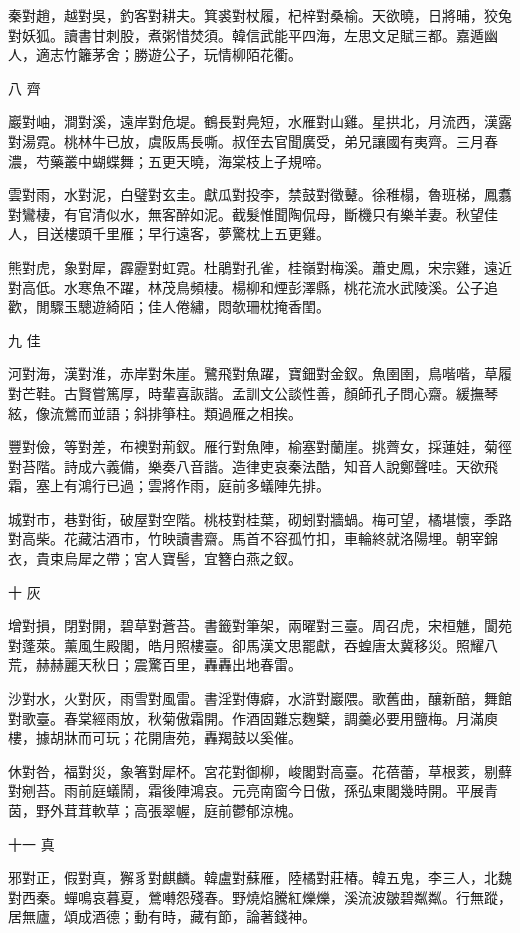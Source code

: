 \documentclass[12pt,a4paper]{ctexbook}
\begin{document}
秦對趙，越對吳，釣客對耕夫。箕裘對杖履，杞梓對桑榆。天欲曉，日將晡，狡兔對妖狐。讀書甘刺股，煮粥惜焚須。韓信武能平四海，左思文足賦三都。嘉遁幽人，適志竹籬茅舍；勝遊公子，玩情柳陌花衢。\par
八 齊\par
巖對岫，澗對溪，遠岸對危堤。鶴長對鳧短，水雁對山雞。星拱北，月流西，漢露對湯霓。桃林牛已放，虞阪馬長嘶。叔侄去官聞廣受，弟兄讓國有夷齊。三月春濃，芍藥叢中蝴蝶舞；五更天曉，海棠枝上子規啼。\par
雲對雨，水對泥，白璧對玄圭。獻瓜對投李，禁鼓對徵鼙。徐稚榻，魯班梯，鳳翥對鸞棲，有官清似水，無客醉如泥。截髮惟聞陶侃母，斷機只有樂羊妻。秋望佳人，目送樓頭千里雁；早行遠客，夢驚枕上五更雞。\par
熊對虎，象對犀，霹靂對虹霓。杜鵑對孔雀，桂嶺對梅溪。蕭史鳳，宋宗雞，遠近對高低。水寒魚不躍，林茂鳥頻棲。楊柳和煙彭澤縣，桃花流水武陵溪。公子追歡，閒驟玉驄遊綺陌；佳人倦繡，悶欹珊枕掩香閨。\par
九 佳\par
河對海，漢對淮，赤岸對朱崖。鷺飛對魚躍，寶鈿對金釵。魚圉圉，鳥喈喈，草履對芒鞋。古賢嘗篤厚，時輩喜詼諧。孟訓文公談性善，顏師孔子問心齋。緩撫琴絃，像流鶯而並語；斜排箏柱。類過雁之相挨。\par
豐對儉，等對差，布襖對荊釵。雁行對魚陣，榆塞對蘭崖。挑薺女，採蓮娃，菊徑對苔階。詩成六義備，樂奏八音諧。造律吏哀秦法酷，知音人說鄭聲哇。天欲飛霜，塞上有鴻行已過；雲將作雨，庭前多蟻陣先排。\par
城對市，巷對街，破屋對空階。桃枝對桂葉，砌蚓對牆蝸。梅可望，橘堪懷，季路對高柴。花藏沽酒市，竹映讀書齋。馬首不容孤竹扣，車輪終就洛陽埋。朝宰錦衣，貴束烏犀之帶；宮人寶髻，宜簪白燕之釵。\par
十 灰\par
增對損，閉對開，碧草對蒼苔。書籤對筆架，兩曜對三臺。周召虎，宋桓魋，閬苑對蓬萊。薰風生殿閣，皓月照樓臺。卻馬漢文思罷獻，吞蝗唐太冀移災。照耀八荒，赫赫麗天秋日；震驚百里，轟轟出地春雷。\par
沙對水，火對灰，雨雪對風雷。書淫對傳癖，水滸對巖隈。歌舊曲，釀新醅，舞館對歌臺。春棠經雨放，秋菊傲霜開。作酒固難忘麴櫱，調羹必要用鹽梅。月滿庾樓，據胡牀而可玩；花開唐苑，轟羯鼓以奚催。\par
休對咎，福對災，象箸對犀杯。宮花對御柳，峻閣對高臺。花蓓蕾，草根荄，剔蘚對剜苔。雨前庭蟻鬧，霜後陣鴻哀。元亮南窗今日傲，孫弘東閣幾時開。平展青茵，野外茸茸軟草；高張翠幄，庭前鬱郁涼槐。\par
十一 真\par
邪對正，假對真，獬豸對麒麟。韓盧對蘇雁，陸橘對莊椿。韓五鬼，李三人，北魏對西秦。蟬鳴哀暮夏，鶯囀怨殘春。野燒焰騰紅爍爍，溪流波皺碧粼粼。行無蹤，居無廬，頌成酒德；動有時，藏有節，論著錢神。\par
\end{document}
